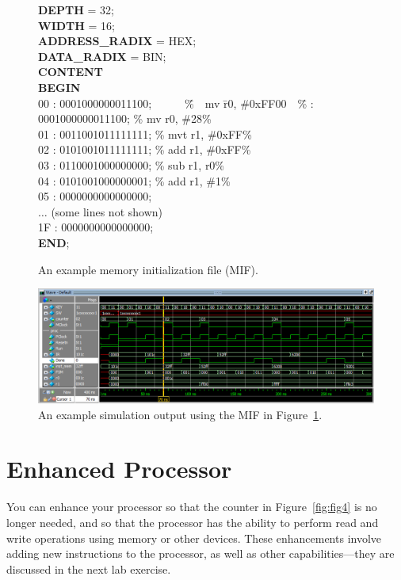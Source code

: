 \documentclass[epsfig,10pt,fullpage]{article} \addtolength{\textwidth}{1.5in}
\begin{document}
\begin{figure}[H]
\begin{center}
\begin{minipage}[t]{12.5 cm}
\begin{tabbing}
{\bf DEPTH} = 32;\\
{\bf WIDTH} = 16;\\
{\bf ADDRESS\_RADIX} = HEX;\\
{\bf DATA\_RADIX} = BIN;\\
{\bf CONTENT}\\
{\bf BEGIN}\\
00	:	0001000000011100;~~~~~~\=\%~~mv  \=r0, \#0xFF00~~\=\% 	:	0001000000011100;	\>\% mv \>r0, \#28\>\%\\
01	:	0011001011111111; \>\% mvt \>r1, \#0xFF\>\%\\
02	:	0101001011111111;	\>\% add  \>r1, \#0xFF\>\%\\
03	:	0110001000000000;	\>\% sub  \>r1, r0\>\%\\
04	:	0101001000000001;	\>\% add  \>r1, \#1\>\%\\
05	:	0000000000000000;\\
$\ldots$ (some lines not shown)\\
1F :	0000000000000000;\\
{\bf END};
\end{tabbing}
\end{minipage}
\end{center}
\caption{An example memory initialization file (MIF).}
\label{fig:fig_MIF}
\end{figure}

\begin{figure}[H]
	\begin{center}
		\includegraphics[width=\textwidth]{figures/figuresim2.png}
	\end{center}
	\caption{An example simulation output using the MIF in Figure~\ref{fig:fig_MIF}.}
	\label{fig:fig_sim2}
\end{figure}

\section*{Enhanced Processor}
You can enhance your processor so that the counter in 
Figure~\ref{fig:fig4} is no longer needed, and so that the processor has the ability to 
perform read and write operations using memory or other devices. These enhancements involve 
adding new instructions to the processor, as well as other capabilities---they are
discussed in the next lab exercise.
\end{document}
